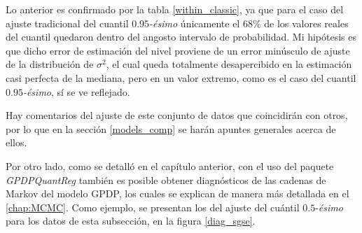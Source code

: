 Lo anterior es confirmado por la tabla \ref{within_classic}, ya que para el caso del ajuste tradicional del cuantil $0.95$\textit{-\'esimo} \'unicamente el $68\%$ de los valores reales del cuantil quedaron dentro del angosto intervalo de probabilidad. Mi hip\'otesis es que dicho error de estimaci\'on del nivel proviene de un error min\'usculo de ajuste de la distribuci\'on de $\sigma^2$, el cual queda totalmente desapercibido en la estimaci\'on casi perfecta de la mediana, pero en un valor extremo, como es el caso del cuantil $0.95$\textit{-\'esimo}, s\'i se ve reflejado.

Hay comentarios del ajuste de este conjunto de datos que coincidir\'an con otros, por lo que en la secci\'on \ref{models_comp} se har\'an apuntes generales acerca de ellos.

Por otro lado, como se detall\'o en el cap\'itulo anterior, con el uso del paquete \textit{GPDPQuantReg} tambi\'en es posible obtener diagn\'osticos de las cadenas de Markov del modelo GPDP, los cuales se explican de manera m\'as detallada en el \autoref{chap:MCMC}. Como ejemplo, se presentan los del ajuste del cu\'antil $0.5$-\textit{\'esimo} para los datos de esta subsecci\'on, en la figura \ref{diag_sgse}.

